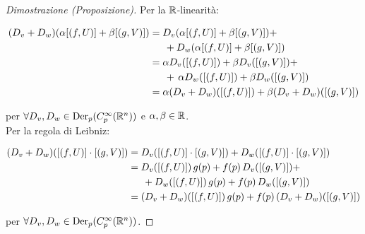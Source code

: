 \begin{proof}[Dimostrazione (Proposizione)]
	Per la $ \mathbb{R} $-linearità:
	
	\begin{align}
		\begin{split}
			(D_{v} + D_{w}) (\alpha [(f,U)] + \beta [(g,V)]) &= D_{v} (\alpha [(f,U)] + \beta [(g,V)]) +\\
			& \hspace{15px} + D_{w} (\alpha [(f,U)] + \beta [(g,V)])\\
			&= \alpha D_{v} ([(f,U)]) + \beta D_{v} ([(g,V)]) +\\
			& \hspace{15px} + \,\alpha D_{w} ([(f,U)]) + \beta D_{w} ([(g,V)])\\
			&= \alpha (D_{v} + D_{w}) ([(f,U)]) + \beta (D_{v} + D_{w}) ([(g,V)])
		\end{split}
	\end{align}

	per $ \forall D_{v}, D_{w} \in \operatorname{Der}_{p}(C_{p}^{\infty}(\mathbb{R}^{n})) $ e $ \alpha,\beta \in \mathbb{R} $.\\
	Per la regola di Leibniz:
	
	\begin{align}
		\begin{split}
			(D_{v} + D_{w}) ([(f,U)] \cdot [(g,V)]) &= D_{v} ([(f,U)] \cdot [(g,V)]) + D_{w} ([(f,U)] \cdot [(g,V)])\\
			&= D_{v} ([(f,U)]) \, g(p) + f(p) \, D_{v} ([(g,V)]) +\\
			& \hspace{15px} + D_{w} ([(f,U)]) \, g(p) + f(p) \, D_{w} ([(g,V)])\\
			&= (D_{v} + D_{w}) ([(f,U)]) \, g(p) + f(p) \, (D_{v} + D_{w}) ([(g,V)])
		\end{split}
	\end{align}

	per $ \forall D_{v}, D_{w} \in \operatorname{Der}_{p}(C_{p}^{\infty}(\mathbb{R}^{n})) $.
\end{proof}

